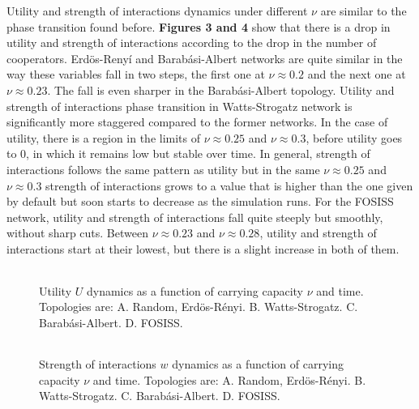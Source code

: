 \documentclass{bmcart}
\def\texttt{[image: ]}
\begin{document}

Utility and strength of interactions dynamics under different $\nu$ are
similar to the phase transition found before. \textbf{Figures 3 and 4}
show that there is a drop in utility and strength of interactions
according to the drop in the number of cooperators. Erd\"{o}s-Reny\'i
and Barab\'asi-Albert networks are quite similar in the way these
variables fall in two steps, the first one at $\nu \approx 0.2$ and
the next one at $\nu \approx 0.23$. The fall is even sharper in the
Barab\'asi-Albert topology. Utility and strength of interactions phase
transition in Watts-Strogatz network is significantly more staggered
compared to the former networks. In the case of utility, there is a
region in the limits of $\nu \approx 0.25$ and $\nu \approx 0.3$,
before utility goes to $0$, in which it remains low but stable over
time. In general, strength of interactions follows the same pattern as
utility but in the same $\nu \approx 0.25$ and $\nu \approx 0.3$
strength of interactions grows to a value that is higher than the one
given by default but soon starts to decrease as the simulation
runs. For the FOSISS network, utility and strength of interactions fall
quite steeply but smoothly, without sharp cuts. Between
$\nu \approx 0.23$ and $\nu \approx 0.28$, utility and strength of
interactions start at their lowest,
but there is a slight increase in both of them.\\


\begin{figure} [h!]
\centering
\begin{tabular}{cc}

\end{tabular}
\caption{Utility $U$ dynamics as a function of carrying capacity $\nu$ and time. Topologies are: A. Random, Erd\"{o}s-R\'enyi. B. Watts-Strogatz. C. Barab\'asi-Albert. D. FOSISS.}\label{fitness}
\end{figure}



\begin{figure} [h!]
\centering
\begin{tabular}{cc}

\end{tabular}
\caption{Strength of interactions $w$ dynamics as a function of carrying capacity $\nu$ and time. Topologies are: A. Random, Erd\"{o}s-R\'enyi. B. Watts-Strogatz. C. Barab\'asi-Albert. D. FOSISS.}\label{trust}
\end{figure}
\end{document}
